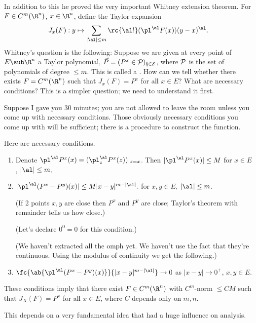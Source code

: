 In addition to this he proved the very important Whitney extension theorem.
For $F\in C^m(\R^n)$, $x\in \R^n$, define the Taylor expansion 
\begin{align}
J_x(F): y\mapsto \sum_{|\al|\le m} \rc{\al!} (\pl^\al F(x)) (y-x)^\al.
\end{align}
Whitney's question is the following: Suppose we are given at every point of $E\sub \R^n$ a Taylor polynomial, $\vec P = (P^x\in \cal P)_{x\in E}$, where $\cal P$ is the set of polynomials of degree $\le m$. This is called a . 
How can we tell whether there exists $F=C^m(\R^n)$ such that $J_x(F)=P^x$ for all $x\in E$? What are necessary conditions?
This is a simpler question; we need to understand it first. 

Suppose I gave you 30 minutes; you are not allowed to leave the room unless you come up with necessary conditions. Those obviously necessary conditions you come up with will be  sufficient; there is a procedure to construct the function.

Here are necessary conditions.
\begin{enumerate}
\item
Denote $\pl^\al P^x(x) = (\pl_z^\al P^x(z))|_{z=x}$. Then $|\pl^\al P^x(x)|\le M$ for $x\in E$, $|\al|\le m$.
\item
$|\pl^\al(P^x - P^y)(x)|\le M|x-y|^{m-|\al|}$. for $x,y\in E$, $|\al|\le m$.

(If 2 points $x,y$ are close then $P^x$ and $P^y$ are close; Taylor's theorem with remainder tells us how close.)

(Let's declare $0^0=0$ for this condition.)

(We haven't extracted all the omph yet. We haven't use the fact that they're continuous. Using the modulus of continuity we get the following.)
\item
$\fc{\ab{\pl^\al (P^x - P^y)(x)}}{|x-y|^{m-|\al|}}\to 0$ as $|x-y|\to 0^+$, $x,y\in E$. 
\end{enumerate}
\begin{thm}
These conditions imply that there exist $F\in C^m(\R^n)$ with $C^m$-norm $\le CM$ such that $J_X(F) = P^x$ for all $x\in E$, where $C$ depends only on $m,n$.
\end{thm}

This depends on a very fundamental idea that had a huge influence on analysis.

